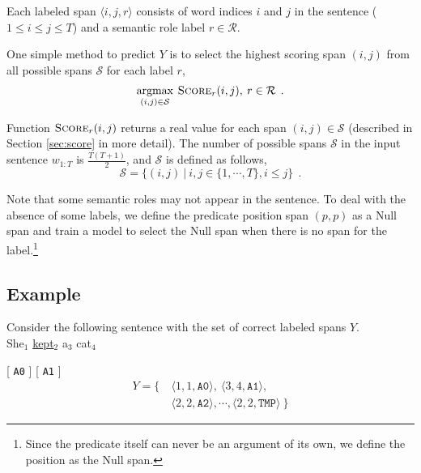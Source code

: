 \documentclass[11pt,a4paper]{article}
\newcommand{\argmax}{\mathop{\rm argmax}\limits}
\begin{document}
\noindent
Each labeled span $\langle i, j, r \rangle$ consists of word indices $i$ and $j$  in the sentence ($1 \le i \le j \le T$) and a semantic role label $r \in \mathcal{R}$.

One simple method to predict $Y$ is to select the highest scoring span $(i, j)$ from all possible spans $\mathcal{S}$ for each label $r$,
\begin{align}
\label{eq:argmax}
\argmax_{(i, j) \in \mathcal{S}} \: \textsc{Score}_r(i, j), \: r \in \mathcal{R} \:\: .
\end{align}

\noindent
Function $\textsc{Score}_r(i, j)$ returns a real value for each span $(i, j) \in \mathcal{S}$ (described in Section \ref{sec:score} in more detail).
The number of possible spans $\mathcal{S}$ in the input sentence $w_{1:T}$ is $\frac{T (T +1)}{2}$, and $\mathcal{S}$ is defined as follows,
\[
\mathcal{S} = \{ (i, j) \: | \: i, j \in \{1, \cdots, T\}, i \le j \} \:\: .
\]

\noindent
Note that some semantic roles may not appear in the sentence.
To deal with the absence of some labels, we define the predicate position span $(p, p)$ as a {\sc Null} span and train a model to select the {\sc Null} span when there is no span for the label.\footnote{Since the predicate itself can never be an argument of its own, we define the position as the {\sc Null} span.}

\subsection*{Example}
Consider the following sentence with the set of correct labeled spans $Y$.\\

\hspace{1.5cm} She$_1$ \hspace{0.2cm} \underline{kept}$_2$ \hspace{0.2cm} a$_3$ \hspace{0.2cm} cat$_4$ 

\hspace{1.4cm} [\hspace{0.05cm} {\tt A0} \hspace{0.05cm}] \hspace{1.1cm} [ \hspace{0.3cm} {\tt A1} \hspace{0.3cm}]
\begin{align*}
Y = \{ \: & \langle 1, 1, \texttt{A0} \rangle, \: \langle 3, 4, \texttt{A1} \rangle,\\
& \langle 2, 2, \texttt{A2} \rangle, \cdots, \langle 2, 2, \texttt{TMP} \rangle \: \}
\end{align*}
\end{document}
